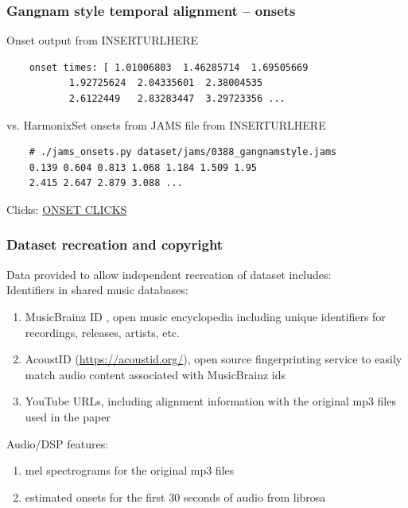 \documentclass{beamer}
\begin{document}

\begin{frame}[fragile]
	\frametitle{Gangnam style temporal alignment -- onsets}
	Onset output from INSERTURLHERE
	\begin{verbatim}
	onset times: [ 1.01006803  1.46285714  1.69505669 
	       1.92725624  2.04335601  2.38004535
	       2.6122449   2.83283447  3.29723356 ...
	\end{verbatim}
	vs. HarmonixSet onsets from JAMS file from INSERTURLHERE
	\begin{verbatim}
	# ./jams_onsets.py dataset/jams/0388_gangnamstyle.jams
	0.139 0.604 0.813 1.068 1.184 1.509 1.95
	2.415 2.647 2.879 3.088 ...
	\end{verbatim}
	Clicks: \href{run:./gangnam_onsets.wav}{ONSET CLICKS}
\end{frame}


\begin{frame}
	\frametitle{Dataset recreation and copyright}
	Data provided to allow independent recreation of dataset includes:\\
	Identifiers in shared music databases:
	\begin{enumerate}
		\item
			MusicBrainz ID , open music encyclopedia including unique identifiers for recordings, releases, artists, etc.
		\item
			AcoustID (\href{https://acoustid.org/}{https://acoustid.org/}), open source fingerprinting service to easily match audio content associated with MusicBrainz ids
		\item
			YouTube URLs, including alignment information with the original mp3 files used in the paper
	\end{enumerate}
	Audio/DSP features:
	\begin{enumerate}
		\item
			mel spectrograms for the original mp3 files
		\item
			estimated onsets for the first 30 seconds of audio from librosa
	\end{enumerate}
\end{frame}
\end{document}
